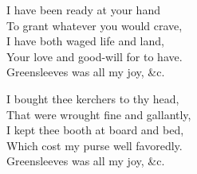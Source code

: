 
\settowidth{\versewidth}{I kept thee booth at board and bed,}
\begin{dcverse}\begin{patverse}
I have been ready at your hand\\
To grant whatever you would crave,\\
I have both waged life and land,\\
Your love and good-will for to have.\\
Greensleeves was all my joy, \&c.
\end{patverse}

\begin{patverse}
I bought thee kerchers to thy head,\\
That were wrought fine and gallantly,\\
I kept thee booth at board and bed,\\
Which cost my purse well favoredly.\\
Greensleeves was all my joy, \&c.
\end{patverse}
\end{dcverse}
\pagebreak

